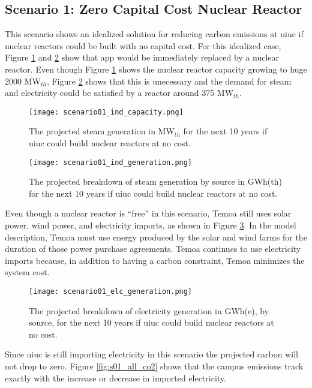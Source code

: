 \subsection{Scenario 1: Zero Capital Cost Nuclear Reactor}

This scenario shows an idealized solution for reducing carbon
emissions at \gls{uiuc} if nuclear reactors could be built with no capital cost.
For this idealized case, Figure \ref{fig:s01_ind_cap} and \ref{fig:s01_ind_gen}
show that \gls{app} would be immediately replaced by a nuclear reactor. Even
though Figure \ref{fig:s01_ind_cap} shows the nuclear reactor capacity growing
to huge 2000 MW$_{th}$, Figure \ref{fig:s01_ind_gen} shows that this is
unecessary and the demand for steam and electricity could be satisfied by
a reactor around 375 MW$_{th}$.

\begin{figure}[ht!]
	\centering
	\texttt{[image: scenario01\_ind\_capacity.png]}
	\caption{The projected steam generation in MW$_{th}$ for the next 10 years
	if \gls{uiuc} could build nuclear reactors at no cost.}
	\label{fig:s01_ind_cap}
\end{figure}

\begin{figure}[ht!]
	\centering
	\texttt{[image: scenario01\_ind\_generation.png]}
	\caption{The projected breakdown of steam generation by source in GWh(th)
	for the next 10 years if \gls{uiuc} could build nuclear reactors at no cost.}
	\label{fig:s01_ind_gen}
\end{figure}

Even though a nuclear reactor is ``free'' in this scenario, Temoa still uses
solar power, wind power, and electricity imports, as shown in Figure
\ref{fig:s01_elc_gen}. In the model description,
Temoa must use energy produced by the solar and wind farms for the duration of
those power purchase agreements. Temoa continues to use electricity imports
because, in addition to having a carbon constraint, Temoa minimizes the system
cost.

\begin{figure}[ht!]
	\centering
	\texttt{[image: scenario01\_elc\_generation.png]}
	\caption{The projected breakdown of electricity generation in GWh(e), by
	source, for the next 10 years if \gls{uiuc} could build nuclear reactors at
	no cost.}
	\label{fig:s01_elc_gen}
\end{figure}

Since \gls{uiuc} is still importing electricity in this scenario the projected
carbon will not drop to zero. Figure \ref{fig:s01_all_co2} shows that the campus
emissions track exactly with the increase or decrease in imported electricity.

